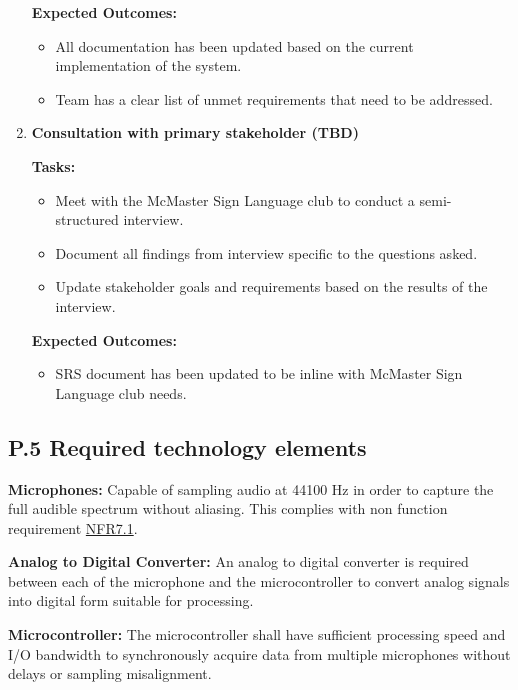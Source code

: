 \documentclass[12pt]{article}
\theoremstyle{definition}
\begin{document}
\begin{enumerate}
  \textbf{Expected Outcomes:}
  \begin{itemize}
      \item All documentation has been updated based on the current 
      implementation of the system. 
      \item Team has a clear list of unmet requirements that need to be 
      addressed. 
  \end{itemize}

  \vspace{0.8em}
  
  \item \textbf{Consultation with primary stakeholder (TBD)}    

  \textbf{Tasks:}
  \begin{itemize}
      \item Meet with the McMaster Sign Language club to conduct a
      semi-structured interview.
      \item Document all findings from interview specific to the questions
      asked. 
      \item Update stakeholder goals and requirements based on the results of 
      the interview. 
  \end{itemize}

  \textbf{Expected Outcomes:}
  \begin{itemize}
      \item SRS document has been updated to be inline with McMaster Sign 
      Language club needs. 
  \end{itemize}

  \vspace{0.8em}

\end{enumerate}


\subsection{P.5 Required technology elements}

\textbf{Microphones:}
Capable of sampling audio at 44100 Hz in order to capture the full audible
spectrum without aliasing. This complies with non function requirement 
\hyperref[NFR7_1]{NFR7.1}.
  
\textbf{Analog to Digital Converter:}
An analog to digital converter is required between each of the microphone and
the microcontroller to convert analog signals into digital form suitable
for processing.
  
\textbf{Microcontroller:} 
The microcontroller shall have sufficient processing speed and I/O bandwidth to
synchronously acquire data from multiple microphones without delays or sampling
misalignment.
\end{document}
